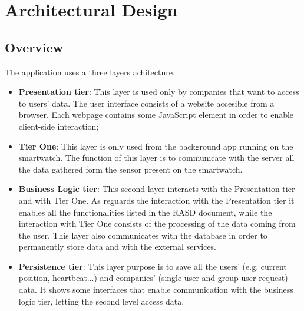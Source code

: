 \documentclass{article}
\begin{document}
\section{Architectural Design}
\subsection{Overview}
The application uses a three layers achitecture.
\begin{itemize}
\item \textbf{Presentation tier}: This layer is used only by companies that want to access to users' data. The user interface consists of a website accesible from a browser. Each webpage contains some JavaScript element in order to enable client-side interaction;
\item \textbf{Tier One}: This layer is only used from the background app running on the smartwatch. The function of this layer is to communicate with the server all the data gathered form the sensor present on the smartwatch. 
\item \textbf{Business Logic tier}: This second layer interacts with the Presentation tier and with Tier One. As reguards the interaction with the Presentation tier it enables all the functionalities listed in the RASD document, while the interaction with Tier One consists of the processing of the data coming from the user. This layer also communicates with the database in order to permanently store data and with the external services.
\item \textbf{Persistence tier}: This layer purpose is to save all the users' (e.g. current position, heartbeat...) and companies' (single user and group user request) data. It shows some interfaces that enable communication with the business logic tier, letting the second level access data.
\end{itemize}
\end{document}
